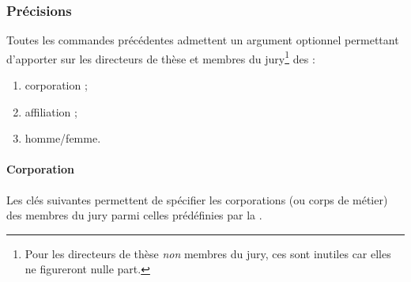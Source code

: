 \subsubsection{Précisions}\label{sec-options-staff}

Toutes les commandes précédentes admettent un argument optionnel permettant
d'apporter sur les directeurs de thèse et membres du jury\footnote{Pour les
  directeurs de thèse \emph{non} membres du jury, ces  sont
  inutiles car elles ne figureront nulle part.}
des  :
\begin{enumerate}
\item corporation ;
\item affiliation ;
\item homme/femme.
\end{enumerate}

\paragraph{Corporation}
\label{sec-corps}%
%
%
%
%
%
%
%
%

Les clés suivantes\syntaxeoptions{} permettent de spécifier les corporations (ou
corps de métier) des membres du jury parmi celles prédéfinies par la \yatCl{}.

